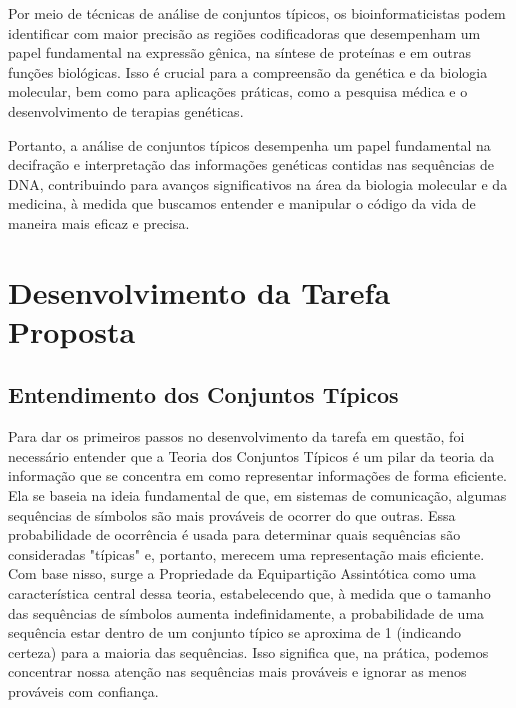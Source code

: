 \documentclass{article}
\begin{document}
Por meio de técnicas de análise de conjuntos típicos, os bioinformaticistas podem identificar com maior precisão as regiões codificadoras que desempenham um papel fundamental na expressão gênica, na síntese de proteínas e em outras funções biológicas. Isso é crucial para a compreensão da genética e da biologia molecular, bem como para aplicações práticas, como a pesquisa médica e o desenvolvimento de terapias genéticas.

Portanto, a análise de conjuntos típicos desempenha um papel fundamental na decifração e interpretação das informações genéticas contidas nas sequências de DNA, contribuindo para avanços significativos na área da biologia molecular e da medicina, à medida que buscamos entender e manipular o código da vida de maneira mais eficaz e precisa.

\section{Desenvolvimento da Tarefa Proposta}

\subsection{Entendimento dos Conjuntos Típicos}

Para dar os primeiros passos no desenvolvimento da tarefa em questão, foi necessário entender que a Teoria dos Conjuntos Típicos é um pilar da teoria da informação que se concentra em como representar informações de forma eficiente. Ela se baseia na ideia fundamental de que, em sistemas de comunicação, algumas sequências de símbolos são mais prováveis de ocorrer do que outras. Essa probabilidade de ocorrência é usada para determinar quais sequências são consideradas "típicas" e, portanto, merecem uma representação mais eficiente. Com base nisso, surge a Propriedade da Equipartição Assintótica como uma característica central dessa teoria, estabelecendo que, à medida que o tamanho das sequências de símbolos aumenta indefinidamente, a probabilidade de uma sequência estar dentro de um conjunto típico se aproxima de 1 (indicando certeza) para a maioria das sequências. Isso significa que, na prática, podemos concentrar nossa atenção nas sequências mais prováveis e ignorar as menos prováveis com confiança. 
\end{document}
